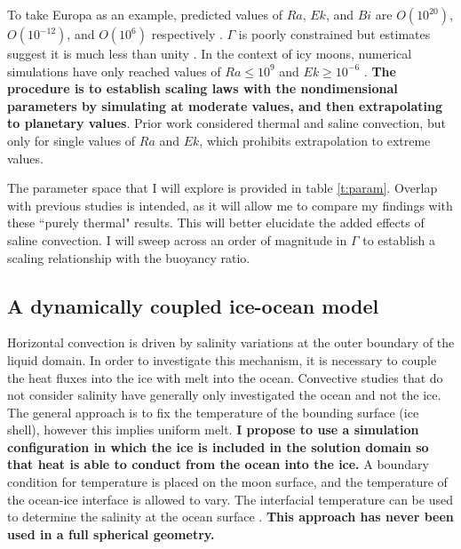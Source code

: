 \documentclass[12pt]{article}
\def\lb{\left(}
\def\rb{\right)}
\begin{document}

To take Europa as an example, predicted values of $Ra$,  $Ek$, and $Bi$ are $O\lb 10^{20}\rb $, $O\lb 10^{-12}\rb $, and $O\lb 10^{6}\rb $ respectively \citep{dL23}. $\Gamma$ is poorly constrained but estimates suggest it is much less than unity \citep{yA21}. In the context of icy moons, numerical simulations have only reached values of $Ra \le 10^{9}$ and $Ek \ge 10^{-6}$ \citep{dL23}. 
\textbf{The procedure is to establish scaling laws with the nondimensional parameters by simulating at moderate values, and then extrapolating to planetary values}. 
Prior work \citep{yA21} considered thermal and saline convection, but only for single values of $Ra$ and $Ek$, which prohibits extrapolation to extreme values.

The parameter space that I will explore is provided in table \ref{t:param}. Overlap with previous studies \citep{dL23,kS19} is intended, as it will allow me to compare my findings with these ``purely thermal" results. This will better elucidate the added effects of saline convection.
I will sweep across an order of magnitude in $\Gamma$ to establish a scaling relationship with the buoyancy ratio. 
\subsection{A dynamically coupled ice-ocean model}

Horizontal convection is driven by salinity variations at the outer boundary of the liquid domain. In order to investigate this mechanism, it is necessary to couple the heat fluxes into the ice with melt into the ocean. 
Convective studies that do not consider salinity have generally only investigated the ocean \citep{kS19,dL23} and not the ice. The general approach is to fix the temperature of the bounding surface (ice shell), however this implies uniform melt.
\textbf{I propose to use a simulation configuration in which the ice is included in the solution domain so that heat is able to conduct from the ocean into the ice.} 
A boundary condition for temperature is placed on the moon surface, and the temperature of the ocean-ice interface is allowed to vary. The interfacial temperature can be used to determine the salinity at the ocean surface \citep{wK22}.
\textbf{This approach has never been used in a full spherical geometry.}
\end{document}
